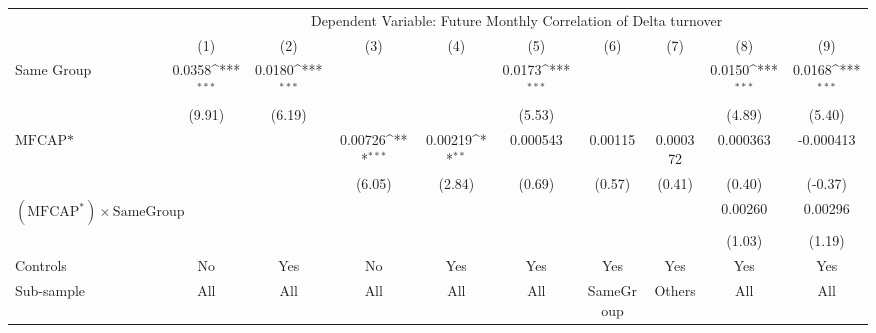 {
\def\sym#1{\ifmmode^{#1}\else\(^{#1}\)\fi}
\begin{tabular}{l*{9}{c}}
\hline\hline
                &\multicolumn{9}{c}{Dependent Variable:  Future Monthly Correlation of Delta turnover}                                                                                     \\\cmidrule(lr){2-10}
                &\multicolumn{1}{c}{(1)}         &\multicolumn{1}{c}{(2)}         &\multicolumn{1}{c}{(3)}         &\multicolumn{1}{c}{(4)}         &\multicolumn{1}{c}{(5)}         &\multicolumn{1}{c}{(6)}         &\multicolumn{1}{c}{(7)}         &\multicolumn{1}{c}{(8)}         &\multicolumn{1}{c}{(9)}         \\
\hline
Same Group      &   0.0358\sym{***}&   0.0180\sym{***}&                  &                  &   0.0173\sym{***}&                  &                  &   0.0150\sym{***}&   0.0168\sym{***}\\
                &   (9.91)         &   (6.19)         &                  &                  &   (5.53)         &                  &                  &   (4.89)         &   (5.40)         \\
[1em]
$ \text{MFCAP*} $&                  &                  &  0.00726\sym{***}&  0.00219\sym{**} & 0.000543         &  0.00115         & 0.000372         & 0.000363         &-0.000413         \\
                &                  &                  &   (6.05)         &   (2.84)         &   (0.69)         &   (0.57)         &   (0.41)         &   (0.40)         &  (-0.37)         \\
[1em]
 $ (\text{MFCAP}^*) \times {\text{SameGroup} }  $ &                  &                  &                  &                  &                  &                  &                  &  0.00260         &  0.00296         \\
                &                  &                  &                  &                  &                  &                  &                  &   (1.03)         &   (1.19)         \\
\hline
Controls        &       No         &      Yes         &       No         &      Yes         &      Yes         &      Yes         &      Yes         &      Yes         &      Yes         \\
Sub-sample      &      All         &      All         &      All         &      All         &      All         &SameGroup         &   Others         &      All         &      All         \\

\end{tabular}}
